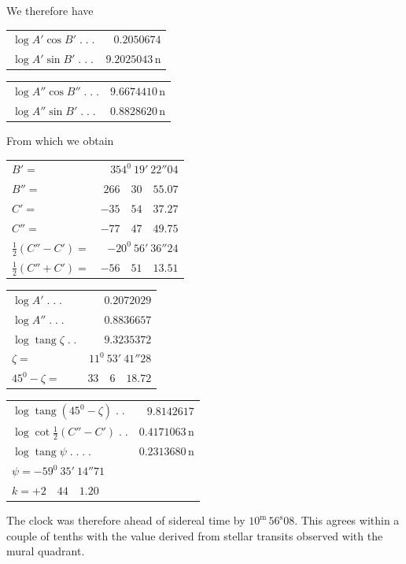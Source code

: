 We therefore have
\begin{center}\small
\begin{minipage}[t]{.49\textwidth}\centering
\begin{tabular}[t]{@{}lr@{}}
$\log A'\cos B'\;.\;.\;.$&$0.2050674$\\
$\log A'\sin B'\;.\;.\;.$&$9.2025043\,\mathrm n$
\end{tabular}
\end{minipage}\hfill
\begin{minipage}[t]{.49\textwidth}\centering
\begin{tabular}[t]{@{}lr@{}}
$\log A''\cos B''\;.\;.\;.$&$9.6674410\,\mathrm n$\\
$\log A''\sin B'\;.\;.\;.$&$0.8828620\,\mathrm n$
\end{tabular}
\end{minipage}
\end{center}
From which we obtain
\begin{center}\small
\begin{minipage}[t]{.49\textwidth}\centering
\begin{tabular}[t]{@{}lr@{}}
$B'=$&$354^0\ 19'\ 22''04$\\
$B''=$&$266\quad30\quad55.07$\\[6pt]
$C'=$&$-35\quad54\quad37.27$\\
$C''=$&$-77\quad47\quad49.75$\\[6pt]
$\tfrac12(C''-C')=$&$-20^0\ 56'\ 36''24$\\
$\tfrac12(C''+C')=$&$-56\quad51\quad13.51$
\end{tabular}
\end{minipage}\hfill
\begin{minipage}[t]{.49\textwidth}\centering
\begin{tabular}[t]{@{}lr@{}}
$\log A'\;.\;.\;.$&$0.2072029$\\
$\log A''\;.\;.\;.$&$0.8836657$\\[6pt]
$\log\operatorname{tang}\zeta\;.\;.$&$9.3235372$\\
$\zeta=$&$11^0\ 53'\ 41''28$\\[6pt]
$45^0-\zeta=$&$33\quad6\quad18.72$
\end{tabular}
\end{minipage}
\par\medskip
\begin{tabular}{lr}
$\log\operatorname{tang}(45^0-\zeta)\;.\;.$&$9.8142617$\\
$\log\cot\tfrac12(C''-C')\;.\;.$&$0.4171063\,\mathrm n$\\\hline
$\log\operatorname{tang}\psi\;.\;.\;.\;.$&$0.2313680\,\mathrm n$\\
\multicolumn{2}{l}{$\psi=-59^0\ 35'\ 14''71$}\\
\multicolumn{2}{l}{$k=+2\quad44\quad1.20$}
\end{tabular}
\end{center}
The clock was therefore ahead of sidereal time by $10^{\mathrm m}\,56^{\mathrm s}08$.
%
This agrees within a couple of tenths with the value derived from stellar transits observed with the mural quadrant.

